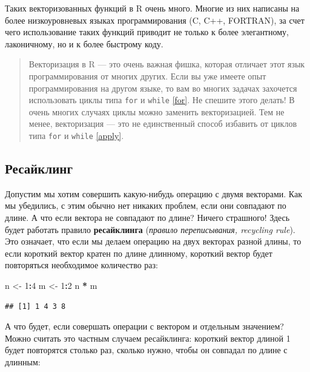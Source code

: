 \documentclass[]{book}
\newenvironment{Shaded}{\begin{snugshade}}{\end{snugshade}}
\newcommand{\DecValTok}[1]{\textcolor[rgb]{0.00,0.00,0.81}{#1}}
\newcommand{\StringTok}[1]{\textcolor[rgb]{0.31,0.60,0.02}{#1}}
\newcommand{\OperatorTok}[1]{\textcolor[rgb]{0.81,0.36,0.00}{\textbf{#1}}}
\newcommand{\NormalTok}[1]{#1}
\begin{document}
Таких векторизованных функций в R очень много. Многие из них написаны на
более низкоуровневых языках программирования (C, C++, FORTRAN), за счет
чего использование таких функций приводит не только к более элегантному,
лаконичному, но и к более быстрому коду.

\begin{quote}
Векторизация в R --- это очень важная фишка, которая отличает этот язык
программирования от многих других. Если вы уже имеете опыт
программирования на другом языке, то вам во многих задачах захочется
использовать циклы типа \texttt{for} и \texttt{while} \ref{for}. Не
спешите этого делать! В очень многих случаях циклы можно заменить
векторизацией. Тем не менее, векторизация --- это не единственный способ
избавить от циклов типа \texttt{for} и \texttt{while} \ref{apply}.
\end{quote}

\subsection{Ресайклинг}\label{recycling}

Допустим мы хотим совершить какую-нибудь операцию с двумя векторами. Как
мы убедились, с этим обычно нет никаких проблем, если они совпадают по
длине. А что если вектора не совпадают по длине? Ничего страшного! Здесь
будет работать правило \textbf{ресайклинга} (\emph{правило
переписывания, recycling rule}). Это означает, что если мы делаем
операцию на двух векторах разной длины, то если короткий вектор кратен
по длине длинному, короткий вектор будет повторяться необходимое
количество раз:

\begin{Shaded}
\begin{Highlighting}[]
\NormalTok{n <-}\StringTok{ }\DecValTok{1}\OperatorTok{:}\DecValTok{4}
\NormalTok{m <-}\StringTok{ }\DecValTok{1}\OperatorTok{:}\DecValTok{2}
\NormalTok{n }\OperatorTok{*}\StringTok{ }\NormalTok{m}
\end{Highlighting}
\end{Shaded}

\begin{verbatim}
## [1] 1 4 3 8
\end{verbatim}

А что будет, если совершать операции с вектором и отдельным значением?
Можно считать это частным случаем ресайклинга: короткий вектор длиной 1
будет повторятся столько раз, сколько нужно, чтобы он совпадал по длине
с длинным:
\end{document}

